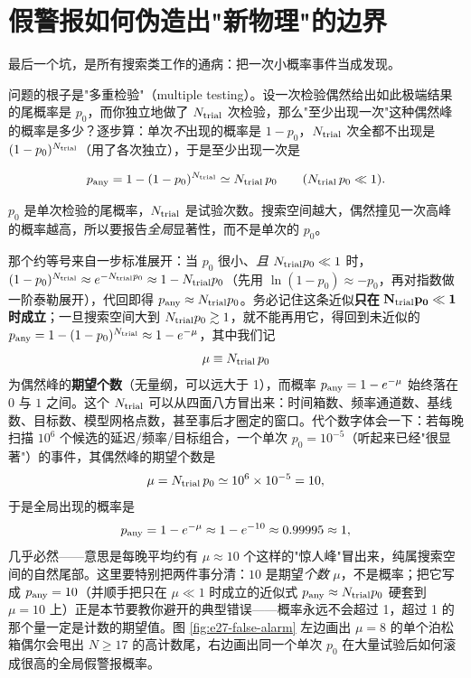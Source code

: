 \section{假警报如何伪造出"新物理"的边界}
\label{sec:e27-false-alarm}

最后一个坑，是所有搜索类工作的通病：把一次小概率事件当成发现。

问题的根子是"多重检验"（multiple testing）。设一次检验偶然给出如此极端结果的尾概率是 \(p_0\)，而你独立地做了 \(N_{\rm trial}\) 次检验，那么"至少出现一次"这种偶然峰的概率是多少？逐步算：单次\emph{不}出现的概率是 \(1-p_0\)，\(N_{\rm trial}\) 次全都不出现是 \((1-p_0)^{N_{\rm trial}}\)（用了各次独立），于是至少出现一次是

\begin{equation}
  p_{\rm any}=1-(1-p_0)^{N_{\rm trial}}
  \simeq N_{\rm trial}\,p_0
  \qquad(N_{\rm trial}\,p_0\ll1).
  \label{eq:e27-trials}
\end{equation}
\begin{formulaexplain}
\(p_0\) 是单次检验的尾概率，\(N_{\rm trial}\) 是试验次数。搜索空间越大，偶然撞见一次高峰的概率越高，所以要报告\emph{全局}显著性，而不是单次的 \(p_0\)。
\end{formulaexplain}

那个约等号来自一步标准展开：当 \(p_0\) 很小、\emph{且} \(N_{\rm trial}p_0\ll1\) 时，\((1-p_0)^{N_{\rm trial}}\approx e^{-N_{\rm trial}p_0}\approx1-N_{\rm trial}p_0\)（先用 \(\ln(1-p_0)\approx-p_0\)，再对指数做一阶泰勒展开），代回即得 \(p_{\rm any}\approx N_{\rm trial}p_0\)。务必记住这条近似\textbf{只在 }\(\mathbf{N_{\rm trial}p_0\ll1}\)\textbf{ 时成立}；一旦搜索空间大到 \(N_{\rm trial}p_0\gtrsim1\)，就不能再用它，得回到未近似的 \(p_{\rm any}=1-(1-p_0)^{N_{\rm trial}}\approx1-e^{-\mu}\)，其中我们记
\[
  \mu\equiv N_{\rm trial}\,p_0
\]
为偶然峰的\textbf{期望个数}（无量纲，可以远大于 1），而概率 \(p_{\rm any}=1-e^{-\mu}\) 始终落在 \(0\) 与 \(1\) 之间。这个 \(N_{\rm trial}\) 可以从四面八方冒出来：时间箱数、频率通道数、基线数、目标数、模型网格点数，甚至事后才圈定的窗口。代个数字体会一下：若每晚扫描 \(10^6\) 个候选的延迟/频率/目标组合，一个单次 \(p_0=10^{-5}\)（听起来已经"很显著"）的事件，其偶然峰的期望个数是
\[
  \mu=N_{\rm trial}\,p_0\simeq10^{6}\times10^{-5}=10,
\]
于是全局出现的概率是
\[
  p_{\rm any}=1-e^{-\mu}\approx1-e^{-10}\approx0.99995\approx1,
\]
几乎必然——意思是每晚平均约有 \(\mu\approx10\) 个这样的"惊人峰"冒出来，纯属搜索空间的自然尾部。这里要特别把两件事分清：\(10\) 是期望\emph{个数} \(\mu\)，不是概率；把它写成 \(p_{\rm any}=10\)（并顺手把只在 \(\mu\ll1\) 时成立的近似式 \(p_{\rm any}\approx N_{\rm trial}p_0\) 硬套到 \(\mu=10\) 上）正是本节要教你避开的典型错误——概率永远不会超过 1，超过 1 的那个量一定是计数的期望值。图 \ref{fig:e27-false-alarm} 左边画出 \(\mu=8\) 的单个泊松箱偶尔会甩出 \(N\ge17\) 的高计数尾，右边画出同一个单次 \(p_0\) 在大量试验后如何滚成很高的全局假警报概率。

